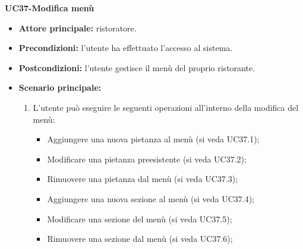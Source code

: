 \iffalse %
    \textbf{UC36.4-Visualizzazione lista Clienti}  %
\begin{itemize}
    \item \textbf{Attore principale:} ristoratore.
    \item \textbf{Precondizioni:} 
    \item \textbf{Postcondizioni:} l'utente visualizza la lista dei clienti collegati alla singola prenotazione.
    \item \textbf{Scenario principale:}
\end{itemize}

Non sono sicuro di questa perché a mio parere c'è molta somiglianza tra uc36.4 e uc40
\fi %


\textbf{UC37-Modifica menù}  
\begin{itemize}
    \item \textbf{Attore principale:} ristoratore.
    \item \textbf{Precondizioni:} l'utente ha effettuato l'accesso al sistema.
    \item \textbf{Postcondizioni:} l'utente gestisce il menù del proprio ristorante.
    \item \textbf{Scenario principale:}
    \begin{enumerate}
        \item L'utente può eseguire le seguenti operazioni all'interno della modifica del menù:
        \begin{itemize}
           \item Aggiungere una nuova pietanza al menù (si veda UC37.1);
           \item Modificare una pietanza preesistente (si veda UC37.2);
           \item Rimuovere una pietanza dal menù (si veda UC37.3);
           \item Aggiungere una nuova sezione al menù (si veda UC37.4);
           \item Modificare una sezione del menù (si veda UC37.5);
           \item Rimuovere una sezione dal menù (si veda UC37.6);
        \end{itemize}
    \end{enumerate}
\end{itemize}